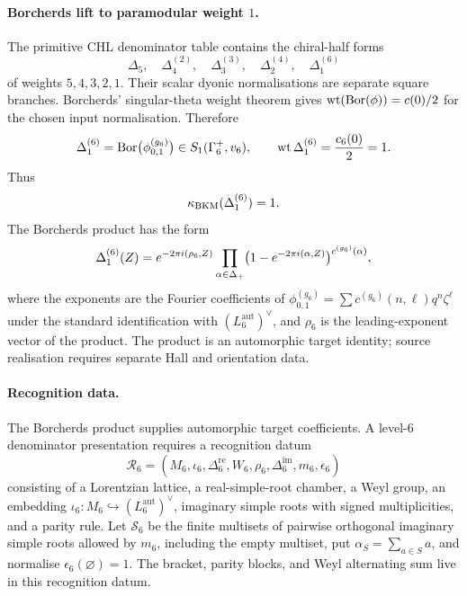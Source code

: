 \paragraph{Borcherds lift to paramodular weight $1$.}
The primitive CHL denominator table contains the chiral-half forms
\[
  \Delta_5,\quad
  \Delta_{4}^{(2)},\quad \Delta_{3}^{(3)},\quad
  \Delta_{2}^{(4)},\quad \Delta_{1}^{(6)}
\]
of weights $5,4,3,2,1$. Their scalar dyonic normalisations are separate
square branches. Borcherds' singular-theta weight theorem gives
\(\mathrm{wt}(\mathrm{Bor}(\phi))=c(0)/2\) for the chosen input normalisation.
Therefore
\[
  \Delta_{1}^{(6)}=\mathrm{Bor}\bigl(\phi^{(g_6)}_{0,1}\bigr)
  \in S_1(\Gamma_{6}^{+},v_6),
  \qquad
  \mathrm{wt}\,\Delta_{1}^{(6)}=\frac{c_6(0)}{2}=1 .
\]
Thus
\[
  \kappa_{\mathrm{BKM}}(\Delta_{1}^{(6)})=1 .
\]
The Borcherds product has the form
\[
  \Delta_{1}^{(6)}(Z)
  =e^{-2\pi i(\rho_6,Z)}
  \prod_{\alpha\in\Delta_+}
  \bigl(1-e^{-2\pi i(\alpha,Z)}\bigr)^{c^{(g_6)}(\alpha)},
\]
where the exponents are the Fourier coefficients of
$\phi^{(g_6)}_{0,1}=\sum c^{(g_6)}(n,\ell)q^n\zeta^\ell$ under the
standard identification with $(L_6^{\mathrm{aut}})^\vee$, and $\rho_6$
is the leading-exponent vector of the product. The product is an
automorphic target identity; source realisation requires separate Hall
and orientation data.

\paragraph{Recognition data.}
The Borcherds product supplies automorphic target coefficients. A
level-$6$ denominator presentation requires a recognition datum
\[
  \mathscr R_6=(M_6,\iota_6,\Delta^{\mathrm{re}}_6,W_6,\rho_6,
  \Delta^{\mathrm{im}}_6,m_6,\epsilon_6)
\]
consisting of a Lorentzian lattice, a real-simple-root chamber, a Weyl
group, an embedding $\iota_6\colon M_6\hookrightarrow
(L_6^{\mathrm{aut}})^\vee$, imaginary simple roots with signed
multiplicities, and a parity rule. Let $\mathcal S_6$ be the finite
multisets of pairwise orthogonal imaginary simple roots allowed by
$m_6$, including the empty multiset, put $\alpha_S=\sum_{a\in S}a$, and
normalise $\epsilon_6(\varnothing)=1$. The bracket, parity blocks, and
Weyl alternating sum live in this recognition datum.

